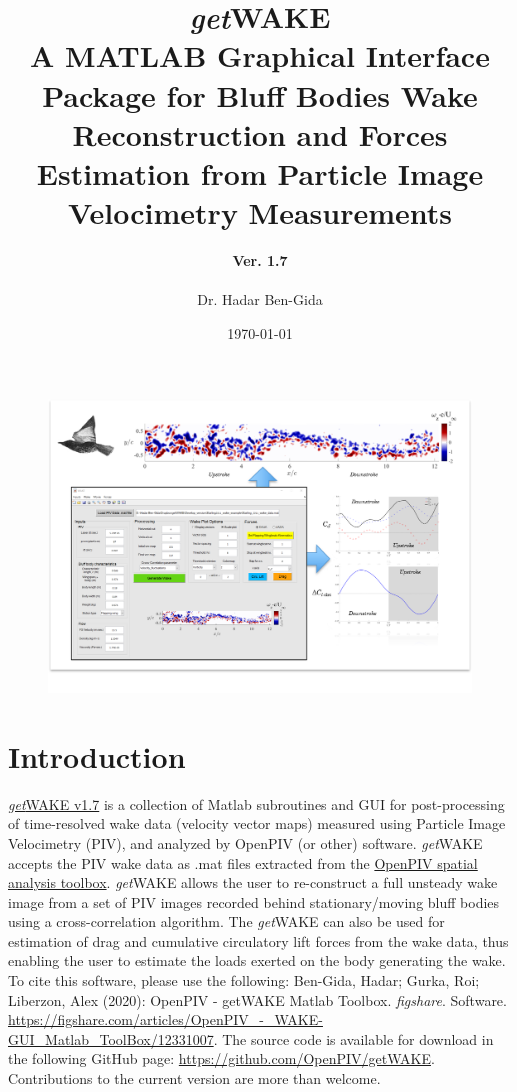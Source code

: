 \documentclass[12pt,a4paper]{article}
\title{\textbf{{\Huge \textit{get}WAKE} \\ A MATLAB Graphical Interface Package for Bluff Bodies Wake Reconstruction and Forces Estimation from Particle Image Velocimetry Measurements \newline {} \newline {\Huge User's Manual}}}
\author{
	\textbf{Ver. 1.7}\\
	\\
	Dr. Hadar Ben-Gida
}
\date{\today}
\begin{document}
\ifpdf
\graphicspath{{./Images/}}
\fi

\maketitle
\thispagestyle{empty}

\vspace{2mm} %

\begin{figure}[ht!]
	\centering
	\includegraphics[width=\textwidth]{getWAKE-Overview}
	\label{fig:getWAKE-Overview}
\end{figure}	

\newpage

\tableofcontents

\newpage


\section{Introduction}\label{Intro}

\href{https://github.com/OpenPIV/getWAKE}{\textit{get}WAKE v1.7} is a collection of Matlab subroutines and GUI for post-processing of time-resolved wake data (velocity vector maps) measured using Particle Image Velocimetry (PIV), and analyzed by OpenPIV (or other) software. 
\textit{get}WAKE accepts the PIV wake data as .mat files extracted from the \href{https://github.com/OpenPIV/openpiv-spatial-analysis-toolbox}{OpenPIV spatial analysis toolbox}.
\textit{get}WAKE allows the user to re-construct a full unsteady wake image from a set of PIV images recorded behind stationary/moving bluff bodies using a cross-correlation algorithm.
The \textit{get}WAKE can also be used for estimation of drag and cumulative circulatory lift forces from the wake data, thus enabling the user to estimate the loads exerted on the body generating the wake. 
To cite this software, please use the following:
Ben-Gida, Hadar; Gurka, Roi; Liberzon, Alex (2020): OpenPIV - getWAKE Matlab Toolbox. \textit{figshare}. Software. \url{https://figshare.com/articles/OpenPIV_-_WAKE-GUI_Matlab_ToolBox/12331007}. The source code is available for download in the following GitHub page: \url{https://github.com/OpenPIV/getWAKE}. Contributions to the current version are more than welcome.
\end{document}
